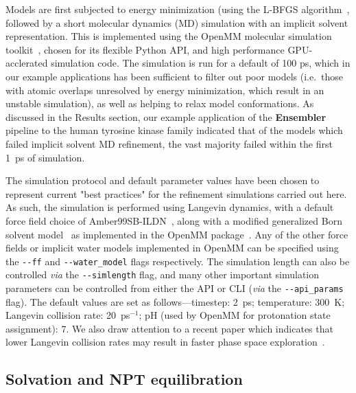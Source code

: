 \documentclass[aps,pre,twocolumn,nofootinbib,superscriptaddress,linenumbers]{revtex4-1}
\begin{document}
Models are first subjected to energy minimization (using the L-BFGS algorithm~\cite{lbfgs}, followed by a short molecular dynamics (MD) simulation with an implicit solvent representation.
This is implemented using the OpenMM molecular simulation toolkit~\cite{eastman:jctc:2012:openmm}, chosen for its flexible Python API, and high performance GPU-acclerated simulation code.
The simulation is run for a default of 100 ps, which in our example applications has been sufficient to filter out poor models (i.e.~those with atomic overlaps unresolved by energy minimization, which result in an unstable simulation), as well as helping to relax model conformations.
As discussed in the Results section, our example application of the {\bf Ensembler} pipeline to the human tyrosine kinase family indicated that of the models which failed implicit solvent MD refinement, the vast majority failed within the first 1~ps of simulation.

The simulation protocol and default parameter values have been chosen to represent current "best practices" for the refinement simulations carried out here.
As such, the simulation is performed using Langevin dynamics, with a default force field choice of Amber99SB-ILDN~\cite{amber99sb-ildn}, along with a modified generalized Born solvent model~\cite{gbsa-obc1} as implemented in the OpenMM package~\cite{eastman:jctc:2012:openmm}.
Any of the other force fields or implicit water models implemented in OpenMM can be specified using the {\tt -{}-ff} and {\tt -{}-water\_model} flags respectively.
The simulation length can also be controlled \emph{via} the {\tt -{}-simlength} flag, and many other important simulation parameters can be controlled from either the API or CLI (\emph{via} the {\tt -{}-api\_params} flag).
The default values are set as follows---timestep: 2~ps; temperature: 300~K; Langevin collision rate: 20~ps$^{-1}$; pH (used by OpenMM for protonation state assignment): 7.
We also draw attention to a recent paper which indicates that lower Langevin collision rates may result in faster phase space exploration~\cite{basconi:jctc:2013:collision-rates}.

\subsection{Solvation and NPT equilibration}
\end{document}
